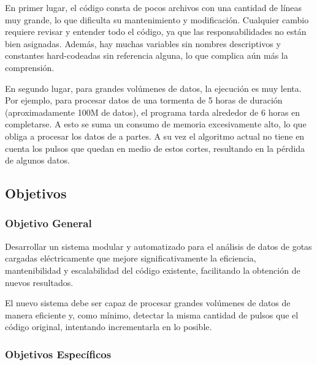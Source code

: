 \documentclass[12pt,a4paper]{article}
\begin{document}
En primer lugar, el código consta de pocos archivos con una cantidad de líneas muy grande, lo que dificulta su mantenimiento y modificación. Cualquier cambio requiere revisar y entender todo el código, ya que las responsabilidades no están bien asignadas. Además, hay muchas variables sin nombres descriptivos y constantes hard-codeadas sin referencia alguna, lo que complica aún más la comprensión.

En segundo lugar, para grandes volúmenes de datos, la ejecución es muy lenta. Por ejemplo, para procesar datos de una tormenta de 5 horas de duración (aproximadamente 100M de datos), el programa tarda alrededor de 6 horas en completarse. A esto se suma un consumo de memoria excesivamente alto, lo que obliga a procesar los datos de a partes. A su vez el algoritmo actual no tiene en cuenta los pulsos que quedan en medio de estos cortes, resultando en la pérdida de algunos datos.

\subsection{Objetivos}
\lhead{}

\subsubsection{Objetivo General}

Desarrollar un sistema modular y automatizado para el análisis de datos de gotas cargadas eléctricamente que mejore significativamente la eficiencia, mantenibilidad y escalabilidad del código existente, facilitando la obtención de nuevos resultados.

El nuevo sistema debe ser capaz de procesar grandes volúmenes de datos de manera eficiente y, como mínimo, detectar la misma cantidad de pulsos que el código original, intentando incrementarla en lo posible.

\subsubsection{Objetivos Específicos}
\end{document}
